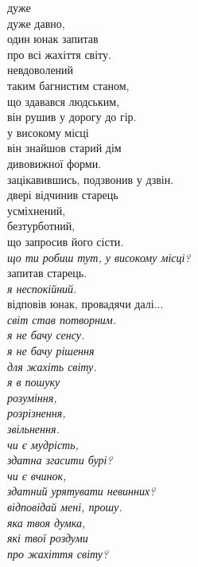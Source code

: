 дуже\\
дуже давно,\\
один юнак запитав\\
про всі жахіття світу.\\

невдоволений\\
таким багнистим станом,\\
що здавався людським,\\
він рушив у дорогу до гір.\\

у високому місці\\
він знайшов старий дім\\
дивовижної форми.\\
зацікавившись, подзвонив у дзвін.\\

двері відчинив старець\\
усміхнений,\\
безтурботний,\\
що запросив його сісти.\\

\emph{що ти робиш тут, у високому місці?}\\
запитав старець.\\
\emph{я неспокійний.}\\
відповів юнак, провадячи далі...\\

\emph{світ став потворним.\\
я не бачу сенсу.\\
я не бачу рішення\\
для жахіть світу.}\\

\emph{я в пошуку\\
розуміння,\\
розрізнення,\\
звільнення.}\\

\emph{чи є мудрість,\\
здатна згасити бурі?\\
чи є вчинок,\\
здатний урятувати невинних?}\\

\emph{відповідай мені, прошу.\\
яка твоя думка,\\
які твої роздуми\\
про жахіття світу?}\\


